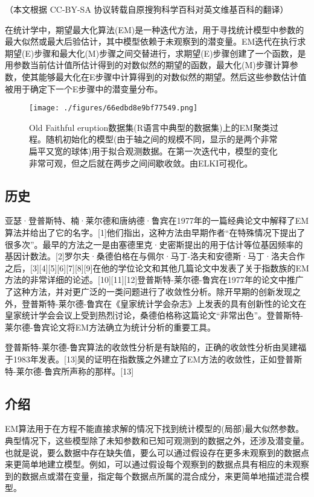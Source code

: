 
（本文根据 CC-BY-SA 协议转载自原搜狗科学百科对英文维基百科的翻译）

在统计学中，期望最大化算法(EM)是一种迭代方法，用于寻找统计模型中参数的最大似然或最大后验估计，其中模型依赖于未观察到的潜变量。EM迭代在执行求期望(E)步骤和最大化(M)步骤之间交替进行，求期望(E)步骤创建了一个函数，是用参数当前估计值所估计得到的对数似然的期望的函数，最大化(M)步骤计算参数，使其能够最大化在E步骤中计算得到的对数似然的期望。然后这些参数估计值被用于确定下一个E步骤中的潜变量分布。

\begin{figure}[ht]
\centering
\texttt{[image: ./figures/66edbd8e9bf77549.png]}
\caption{Old Faithful eruption数据集(R语言中典型的数据集)上的EM聚类过程。随机初始化的模型(由于轴之间的规模不同，显示的是两个非常扁平又宽的球体)用于拟合观测数据。在第一次迭代中，模型的变化非常可观，但之后就在两步之间间歇收敛。由ELKI可视化。} \label{fig_ZDQW_1}
\end{figure}

\subsection{历史}

亚瑟·登普斯特、楠·莱尔德和唐纳德·鲁宾在1977年的一篇经典论文中解释了EM算法并给出了它的名字。[1]他们指出，这种方法由早期作者“在特殊情况下提出了很多次”。最早的方法之一是由塞德里克·史密斯提出的用于估计等位基因频率的基因计数法。[2]罗尔夫·桑德伯格在与佩尔·马丁-洛夫和安德斯·马丁·洛夫合作之后，[3][4][5][6][7][8][9]在他的学位论文和其他几篇论文中发表了关于指数族的EM方法的非常详细的论述。[10][11][12]登普斯特-莱尔德-鲁宾在1977年的论文中推广了这种方法，并对更广泛的一类问题进行了收敛性分析。除开早期的创新发现之外，登普斯特-莱尔德-鲁宾在《皇家统计学会杂志》上发表的具有创新性的论文在皇家统计学会会议上受到热烈讨论，桑德伯格称这篇论文“非常出色”。登普斯特-莱尔德-鲁宾论文将EM方法确立为统计分析的重要工具。

登普斯特-莱尔德-鲁宾算法的收敛性分析是有缺陷的，正确的收敛性分析由吴建福于1983年发表。[13]吴的证明在指数簇之外建立了EM方法的收敛性，正如登普斯特-莱尔德-鲁宾所声称的那样。[13]

\subsection{介绍}

EM算法用于在方程不能直接求解的情况下找到统计模型的(局部)最大似然参数。典型情况下，这些模型除了未知参数和已知可观测到的数据之外，还涉及潜变量。也就是说，要么数据中存在缺失值，要么可以通过假设存在更多未观察到的数据点来更简单地建立模型。例如，可以通过假设每个观察到的数据点具有相应的未观察到的数据点或潜在变量，指定每个数据点所属的混合成分，来更简单地描述混合模型。

